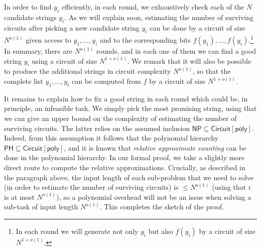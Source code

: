 \documentclass{toc}
\begin{document}
In order to find $y_i$ efficiently, in each round, we exhaustively check each of the $N$ candidate strings $y_i$. As we will explain soon, estimating the number of surviving circuits after picking a new candidate string $y_i$ can be done by a circuit of size $N^{o(1)}$ given access to $y_1, \ldots, y_i$ and to the corresponding bits $f(y_1), \ldots, f(y_i)$.\footnote{ 
In each round we will generate not only $y_i$ but also $f(y_i)$ by a circuit of size $N^{1+o(1)}$.
} In summary, there are $N^{o(1)}$ rounds, and in each one of them we can find a good string $y_i$ using a circuit of size $N^{1 + o(1)}$. We remark that it will also be possible to produce the additional strings in circuit complexity $N^{o(1)}$, so that the complete list $y_1, \ldots, y_t$ can be computed from $f$ by a circuit of size $N^{1 + o(1)}$. 

It remains to explain how to fix a good string in each round which could be, in principle, an infeasible task. We simply pick the most promising string, using that we can %
give an upper bound on %
the complexity of estimating the number of surviving circuits. The latter relies on the assumed inclusion $\mathsf{NP} \subseteq \mathsf{Circuit}[\mathsf{poly}]$. Indeed, from this assumption it follows that the polynomial hierarchy $\mathsf{PH} \subseteq \mathsf{Circuit}[\mathsf{poly}]$, and it is known that \emph{relative approximate counting} can be done in the polynomial hierarchy. In our formal proof, we take a slightly more direct route to compute the relative approximations. Crucially, as described in the paragraph above, the input length of each sub-problem that we need to solve (in order to estimate the number of surviving circuits) is $\leq N^{o(1)}$ (using that $i$ is at most $N^{o(1)}$), so a polynomial overhead will not be an issue when solving a sub-task of input length $N^{o(1)}$. This completes the sketch of the proof.\\
\end{document}
